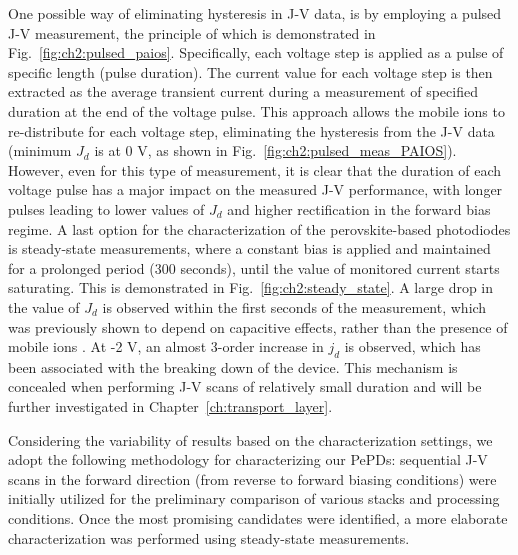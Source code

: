 One possible way of eliminating hysteresis in J-V data, is by employing a pulsed J-V measurement,
the principle of which is demonstrated in Fig.~\ref{fig:ch2:pulsed_paios}. Specifically, each voltage step is applied as a pulse of specific length (pulse duration). The current value for each voltage step is then extracted as the average transient current during a measurement of specified duration at the end of the voltage pulse. This approach allows the mobile ions to re-distribute for each voltage step, eliminating the hysteresis from the J-V data (minimum $J_d$ is at 0 V, as shown in Fig.~\ref{fig:ch2:pulsed_meas_PAIOS}). However, even for this type of measurement, it is clear that the duration of each voltage pulse has a major impact on the measured J-V performance, with longer pulses leading to lower values of $J_d$ and higher rectification in the forward bias regime. A last option for the characterization of the perovskite-based photodiodes is steady-state measurements, where a constant bias is applied and maintained for a prolonged period (300 seconds), until the value of monitored current starts saturating. This is demonstrated in Fig.~\ref{fig:ch2:steady_state}. A large drop in the value of $J_d$ is observed within the first seconds of the measurement, which was previously shown to depend on capacitive effects, rather than the presence of mobile ions \cite{Ollearo2021UltralowGeneration}. At -2 V, an almost 3-order increase in $j_d$ is observed, which has been associated with the breaking down of the device. This mechanism is concealed when performing J-V scans of relatively small duration and will be further investigated in Chapter~\ref{ch:transport_layer}. 

Considering the variability of results based on the characterization settings, we adopt the following methodology for characterizing our PePDs: sequential J-V scans in the forward direction (from reverse to forward biasing conditions) were initially utilized for the preliminary comparison of various stacks and processing conditions. Once the most promising candidates were identified, a more elaborate characterization was performed using steady-state measurements.  


